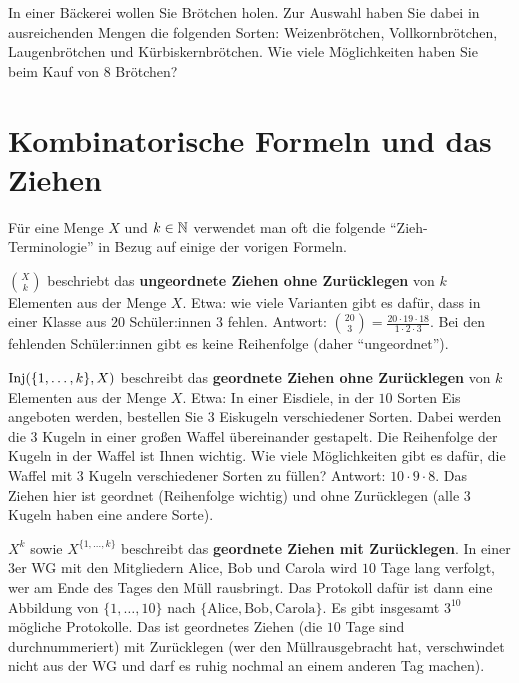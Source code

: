 \begin{aufg}
	In einer Bäckerei wollen Sie Brötchen holen. Zur Auswahl haben Sie dabei in ausreichenden Mengen die folgenden Sorten: Weizenbrötchen, Vollkornbrötchen, Laugenbrötchen und Kürbiskern\-brötchen. Wie viele Möglichkeiten haben Sie beim Kauf von $8$ Brötchen? 
\end{aufg} 

\section{Kombinatorische Formeln und das Ziehen}

\begin{bem}
	Für eine Menge $X$ und $k \in \mathbb{N}$ verwendet man oft die folgende ``Zieh-Terminologie'' in Bezug auf einige der vorigen Formeln. 
\end{bem}

\begin{bem} $\binom{X}{k}$ beschriebt das \textbf{ungeordnete Ziehen ohne Zurücklegen} von $k$ Elementen aus der Menge $X$.  Etwa: wie viele Varianten gibt es dafür, dass in einer Klasse aus $20$ Schüler:innen $3$ fehlen. Antwort: $\binom{20}{3} = \frac{20 \cdot 19 \cdot 18}{1 \cdot 2 \cdot 3}$. Bei den fehlenden Schüler:innen gibt es keine Reihenfolge (daher ``ungeordnet''). 
\end{bem}

\begin{bem} $\operatorname{Inj}(\{1,\ldots,k\},X)$ beschreibt das \textbf{geordnete Ziehen ohne Zurücklegen} von $k$ Elementen aus der Menge $X$. Etwa: In einer Eisdiele, in der $10$ Sorten Eis angeboten werden, bestellen Sie $3$ Eiskugeln verschiedener Sorten. Dabei werden die $3$ Kugeln in einer großen Waffel übereinander gestapelt. Die Reihenfolge der Kugeln in der Waffel ist Ihnen wichtig. Wie viele Möglichkeiten gibt es dafür, die Waffel mit $3$ Kugeln verschiedener Sorten zu füllen? Antwort: $10 \cdot 9 \cdot 8$. Das Ziehen hier ist geordnet (Reihenfolge wichtig) und ohne Zurücklegen (alle $3$ Kugeln haben eine andere Sorte). 
\end{bem}

\begin{bem}
	 $X^k$ sowie $X^{\{1,\ldots,k\}}$ beschreibt das \textbf{geordnete Ziehen mit Zurücklegen}. In einer $3$er WG mit den Mitgliedern Alice, Bob und Carola wird $10$ Tage lang verfolgt, wer am Ende des Tages den Müll rausbringt. Das Protokoll dafür ist dann eine Abbildung von $\{1,\ldots,10\}$ nach $\{\text{Alice},\text{Bob},\text{Carola} \}$.  Es gibt insgesamt $3^{10}$ mögliche Protokolle. Das ist geordnetes Ziehen (die $10$  Tage sind durchnummeriert) mit Zurücklegen (wer den Müllrausgebracht hat, verschwindet  nicht aus der WG und darf es ruhig nochmal an einem anderen Tag machen). 
\end{bem}

